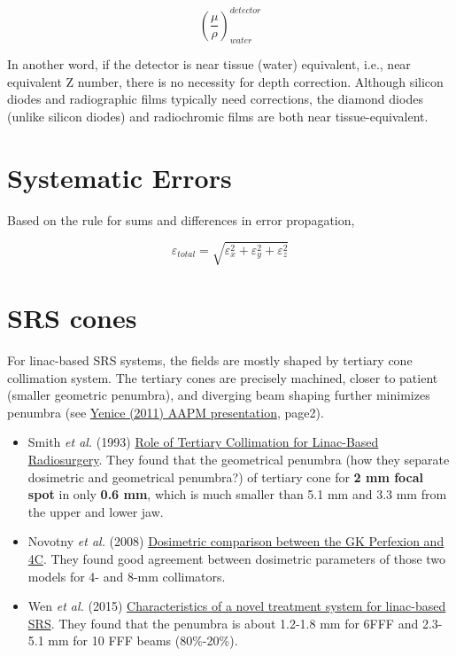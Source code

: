 \documentclass[]{book}
\providecommand{\tightlist}{%
  \setlength{\itemsep}{0pt}\setlength{\parskip}{0pt}}
\theoremstyle{definition}
\theoremstyle{definition}
\theoremstyle{definition}
\theoremstyle{remark}
\begin{document}
\[ \left ( \frac{\mu}{\rho} \right )^{detector}_{water}\]

In another word, if the detector is near tissue (water) equivalent,
i.e., near equivalent Z number, there is no necessity for depth
correction. Although silicon diodes and radiographic films typically
need corrections, the diamond diodes (unlike silicon diodes) and
radiochromic films are both near tissue-equivalent.

\section{Systematic Errors}\label{systematic-errors}

Based on the rule for sums and differences in error propagation,

\[ \varepsilon_{total}=\sqrt{\varepsilon_{x}^{2}+\varepsilon_{y}^{2}+\varepsilon_{z}^{2}} \]

\section{SRS cones}\label{srs-cones}

For linac-based SRS systems, the fields are mostly shaped by tertiary
cone collimation system. The tertiary cones are precisely machined,
closer to patient (smaller geometric penumbra), and diverging beam
shaping further minimizes penumbra (see
\href{http://www.aapm.org/meetings/amos2/pdf/59-17160-8941-53.pdf}{Yenice
(2011) AAPM presentation}, page2).

\begin{itemize}
\tightlist
\item
  Smith \emph{et al.} (1993)
  \href{http://onlinelibrary.wiley.com/doi/10.1002/roi.2970010111/full}{Role
  of Tertiary Collimation for Linac-Based Radiosurgery}. They found that
  the geometrical penumbra (how they separate dosimetric and geometrical
  penumbra?) of tertiary cone for \textbf{2 mm focal spot} in only
  \textbf{0.6 mm}, which is much smaller than 5.1 mm and 3.3 mm from the
  upper and lower jaw.
\item
  Novotny \emph{et al.} (2008)
  \href{http://thejns.org/doi/pdf/10.3171/JNS/2008/109/12/S3}{Dosimetric
  comparison between the GK Perfexion and 4C}. They found good agreement
  between dosimetric parameters of those two models for 4- and 8-mm
  collimators.
\item
  Wen \emph{et al.} (2015)
  \href{http://onlinelibrary.wiley.com/doi/10.1120/jacmp.v16i4.5313/pdf}{Characteristics
  of a novel treatment system for linac-based SRS}. They found that the
  penumbra is about 1.2-1.8 mm for 6FFF and 2.3-5.1 mm for 10 FFF beams
  (80\%-20\%).
\end{itemize}
\end{document}
